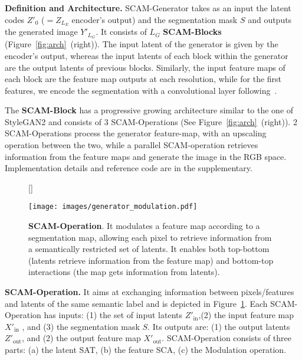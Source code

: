\documentclass[runningheads]{llncs}
\begin{document}
\noindent \textbf{Definition and Architecture.} 
SCAM-Generator takes as an input the latent codes $Z'_0$ ($=Z_{L_E}$ encoder's output) and the segmentation mask $S$ and outputs the generated image $Y'_{L_{G}}$. 
It consists of $L_{G}$ \textbf{SCAM-Blocks} (Figure~\ref{fig:arch}~(right)). 
The input latent of the generator is given by the encoder's output, whereas the input latents of each block within the generator are the output latents of previous blocks. 
Similarly, the input feature maps of each block are the feature map outputs at each resolution, while for the first features, we encode the segmentation with a convolutional layer following~\cite{park2019semantic,Zhu_2020}.

\noindent The \textbf{SCAM-Block} has a progressive growing architecture similar to the one of StyleGAN2 \cite{karras2020analyzing} and consists of 3 SCAM-Operations (See Figure~\ref{fig:arch}~(right)). 2 SCAM-Operations process the generator feature-map, with an upscaling operation between the two, while a parallel SCAM-operation retrieves information from the feature maps and generate the image in the RGB space. Implementation details and reference code are in the supplementary.












\begin{figure}[b]
[\FBwidth]
{\caption{\small{\textbf{SCAM-Operation}. 
    It modulates a feature map according to a segmentation map, allowing each pixel to retrieve information from a semantically restricted set of latents. It enables both top-bottom (latents retrieve information from the feature map) and bottom-top interactions (the map gets information from latents).
    }}}
{\texttt{[image: images/generator\_modulation.pdf]}
\label{fig:scam}}
\end{figure}


\noindent \textbf{SCAM-Operation.} It aims at exchanging information between pixels/features and latents of the same semantic label and is depicted in Figure~\ref{fig:scam}. 
Each SCAM-Operation has inputs: (1) the set of input latents $Z'_{\text{in}}$,(2) the input feature map $X'_{\text{in}}$ , and (3) the segmentation mask $S$. 
Its outputs are: (1) the output latents $Z'_{\text{out}}$, and (2) the output feature map $X'_{\text{out}}$. 
SCAM-Operation consists of three parts: (a) the latent SAT, (b) the feature SCA, (c) the Modulation operation.
\end{document}
